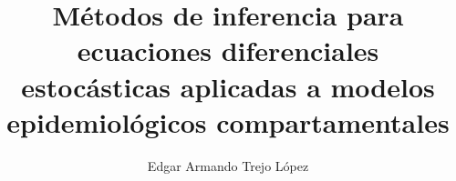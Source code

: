 \usepackage{bachelorstitlepageUNAM} %
\author{Edgar Armando Trejo López}
\title{Métodos de inferencia para ecuaciones diferenciales estocásticas aplicadas a modelos epidemiológicos compartamentales}
